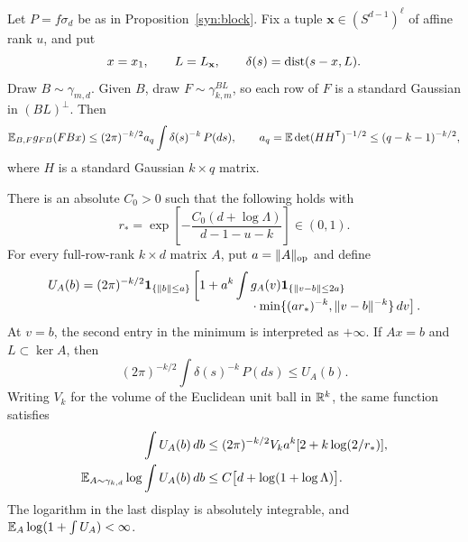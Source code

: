 \begin{lemma}\label{syn:synthetic}
Let \(P=f\sigma_d\) be as in Proposition~\ref{syn:block}.  Fix a tuple
\(\mathbf x\in(S^{d-1})^\ell\) of affine rank \(u\), and put
\[
 x=x_1,\qquad L=L_{\mathbf x},\qquad
 \delta(s)=\operatorname{dist}(s-x,L).
\]
Draw \(B\sim\gamma_{m,d}\).  Given \(B\), draw
\(F\sim\gamma_{k,m}^{BL}\), so each row of \(F\) is a standard Gaussian
in \((BL)^\perp\).  Then
\begin{equation}\label{syn:synthetic-bound}
 \mathbb E_{B,F}g_{FB}(FBx)
 \le (2\pi)^{-k/2}a_q\int\delta(s)^{-k}\,P(ds),\qquad
 a_q=\mathbb E\det(HH^{\mathsf T})^{-1/2}\le(q-k-1)^{-k/2},
\end{equation}
where \(H\) is a standard Gaussian \(k\times q\) matrix.

There is an absolute \(C_0>0\) such that the following holds with
\begin{equation}\label{syn:cutoff}
 r_*=\exp\!\left[-\frac{C_0(d+\log\Lambda)}{d-1-u-k}\right]\in(0,1).
\end{equation}
For every full-row-rank \(k\times d\) matrix \(A\), put \(a=\lVert A\rVert_{\mathrm{op}}\)
and define
\begin{align}
 U_A(b)={}&(2\pi)^{-k/2}\ind_{\{\norm b\le a\}}
 \left[1+a^k\int g_A(v)\ind_{\{\norm{v-b}\le2a\}}\right. \notag\\[-2mm]
 &\hspace{42mm}\left.
       {}\cdot\min\{(ar_*)^{-k},\norm{v-b}^{-k}\}\,dv\right].
 \label{syn:majorant}
\end{align}
At \(v=b\), the second entry in the minimum is interpreted as \(+\infty\).
If \(Ax=b\) and \(L\subset\ker A\), then
\begin{equation}\label{syn:kernel-bound}
 (2\pi)^{-k/2}\int\delta(s)^{-k}\,P(ds)\le U_A(b).
\end{equation}
Writing \(V_k\) for the volume of the Euclidean unit ball in \(\mathbb R^k\),
the same function satisfies
\begin{align}
 \int U_A(b)\,db
 &\le (2\pi)^{-k/2}V_k a^k[2+k\log(2/r_*)],
 \label{syn:majorant-mass}\\
 \mathbb E_{A\sim\gamma_{k,d}}\log\int U_A(b)\,db
 &\le C\bigl[d+\log(1+\log\Lambda)\bigr].
 \label{syn:majorant-log}
\end{align}
The logarithm in the last display is absolutely integrable, and
\(\mathbb E_A\log(1+\int U_A)<\infty\).
\end{lemma}

